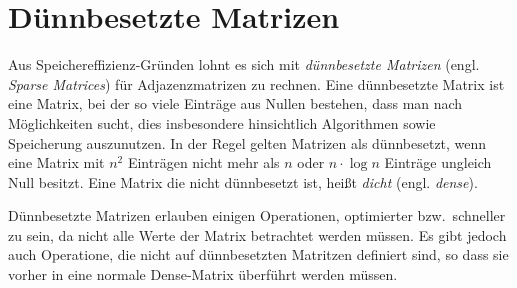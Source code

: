 \section{Dünnbesetzte Matrizen}

Aus Speichereffizienz-Gründen lohnt es sich mit \emph{dünnbesetzte Matrizen} (engl. \emph{Sparse Matrices}) für Adjazenzmatrizen zu rechnen.
Eine dünnbesetzte Matrix ist eine Matrix, bei der so viele Einträge aus Nullen bestehen, dass man nach Möglichkeiten sucht, dies insbesondere hinsichtlich Algorithmen sowie Speicherung auszunutzen.
In der Regel gelten Matrizen als dünnbesetzt, wenn eine Matrix mit $n^2$ Einträgen nicht mehr als $n$ oder $n \cdot \log n$ Einträge ungleich Null besitzt.
Eine Matrix die nicht dünnbesetzt ist, heißt \emph{dicht} (engl. \emph{dense}).

Dünnbesetzte Matrizen erlauben einigen Operationen, optimierter bzw.\ schneller zu sein, da nicht alle Werte der Matrix betrachtet werden müssen.
Es gibt jedoch auch Operatione, die nicht auf dünnbesetzten Matritzen definiert sind, so dass sie vorher in eine normale Dense-Matrix überführt werden müssen.
